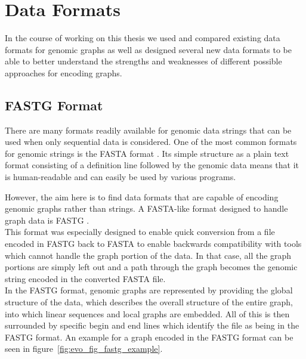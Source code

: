 \documentclass[a4paper,12pt,twoside,BCOR=10mm]{scrbook}
\begin{document}
\section{Data Formats}
\label{sec:methods_data_formats}
%

In the course of working on this thesis we used and compared existing data
formats for genomic graphs as well as designed several new data formats
to be able to better understand the strengths and weaknesses of
different possible approaches for encoding graphs.

\subsection{FASTG Format}

There are many formats readily available for genomic data strings
that can be used when only sequential data is considered.
One of the most common formats for genomic strings is the FASTA format \citep{Childs2007}.
Its simple structure as a plain text format consisting of a definition line
followed by the genomic data means that it is human-readable
and can easily be used by various programs.

However, the aim here is to find data formats that are capable of
encoding genomic graphs rather than strings.
A FASTA-like format designed to handle graph data is FASTG \citep{specFASTG}. \\
This format was especially designed to enable quick conversion from a file
encoded in FASTG back to FASTA to enable backwards compatibility with tools which cannot
handle the graph portion of the data. In that case, all the graph portions are simply left
out and a path through the graph becomes the genomic string encoded in the converted FASTA file. \\
In the FASTG format, genomic graphs are represented by providing the global structure of
the data, which describes the overall structure of the entire graph,
into which linear sequences and local graphs are embedded.
All of this is then surrounded by specific begin and end lines which identify the file as being
in the FASTG format.
An example for a graph encoded in the FASTG format can be seen in figure~\ref{fig:evo_fig_fastg_example}.
\end{document}
